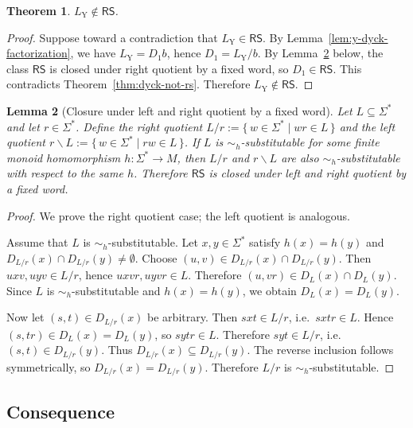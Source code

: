 \documentclass[11pt,a4paper]{article}
\newtheorem{theorem}{Theorem}[section]
\newtheorem{lemma}[theorem]{Lemma}
\begin{document}
\begin{theorem}\label{thm:y-not-rs}
$L_{\mathrm{Y}}\notin\mathsf{RS}$.
\end{theorem}

\begin{proof}
Suppose toward a contradiction that $L_{\mathrm{Y}}\in\mathsf{RS}$. By Lemma~\ref{lem:y-dyck-factorization}, we have $L_{\mathrm{Y}}=D_1b$, hence $D_1=L_{\mathrm{Y}}/b$. By Lemma~\ref{lem:rs-fixed-quotient} below, the class $\mathsf{RS}$ is closed under right quotient by a fixed word, so $D_1\in\mathsf{RS}$. This contradicts Theorem~\ref{thm:dyck-not-rs}. Therefore $L_{\mathrm{Y}}\notin\mathsf{RS}$.
\end{proof}

\begin{lemma}[Closure under left and right quotient by a fixed word]
\label{lem:rs-fixed-quotient}
Let $L\subseteq\Sigma^*$ and let $r\in\Sigma^*$. Define the right quotient $L/r:=\{\,w\in\Sigma^*\mid wr\in L\,\}$ and the left quotient $r\backslash L:=\{\,w\in\Sigma^*\mid rw\in L\,\}$. If $L$ is $\sim_h$-substitutable for some finite monoid homomorphism $h:\Sigma^*\to M$, then $L/r$ and $r\backslash L$ are also $\sim_h$-substitutable with respect to the same $h$. Therefore $\mathsf{RS}$ is closed under left and right quotient by a fixed word.
\end{lemma}

\begin{proof}
We prove the right quotient case; the left quotient is analogous.

Assume that $L$ is $\sim_h$-substitutable. Let $x,y\in\Sigma^*$ satisfy $h(x)=h(y)$ and $D_{L/r}(x)\cap D_{L/r}(y)\neq\emptyset$. Choose $(u,v)\in D_{L/r}(x)\cap D_{L/r}(y)$. Then $uxv,uyv\in L/r$, hence $uxvr,uyvr\in L$. Therefore $(u,vr)\in D_L(x)\cap D_L(y)$. Since $L$ is $\sim_h$-substitutable and $h(x)=h(y)$, we obtain $D_L(x)=D_L(y)$.

Now let $(s,t)\in D_{L/r}(x)$ be arbitrary. Then $sxt\in L/r$, i.e.\ $sxtr\in L$. Hence $(s,tr)\in D_L(x)=D_L(y)$, so $sytr\in L$. Therefore $syt\in L/r$, i.e.\ $(s,t)\in D_{L/r}(y)$. Thus $D_{L/r}(x)\subseteq D_{L/r}(y)$. The reverse inclusion follows symmetrically, so $D_{L/r}(x)=D_{L/r}(y)$. Therefore $L/r$ is $\sim_h$-substitutable.
\end{proof}

\subsection{Consequence}
\end{document}
